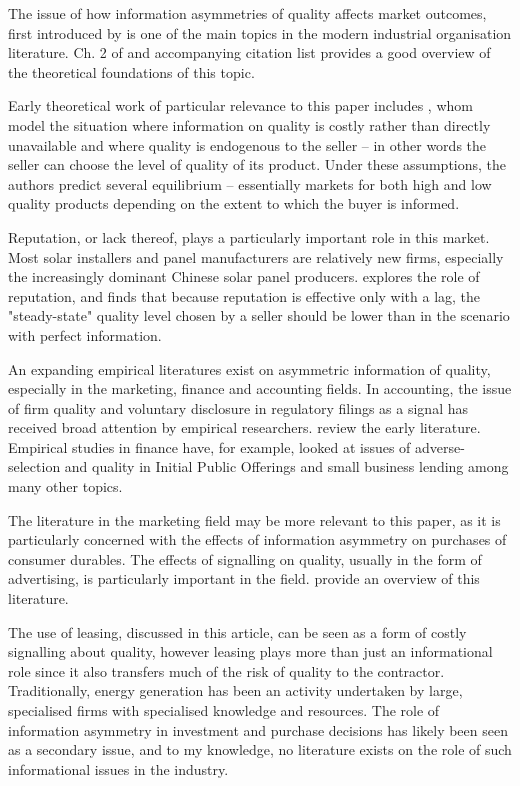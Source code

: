 \documentclass[12pt]{article}
\begin{document}
The issue of how information asymmetries of quality affects market outcomes, first introduced by \citet{akerlof_market_1970} is one of the main topics in the modern industrial organisation literature. Ch. 2 of \citet{tirole_theory_1988} and accompanying citation list provides a good overview of the theoretical foundations of this topic.

Early theoretical work of particular relevance to this paper includes \citet{chan_prices_1982}, whom model the situation where information on quality is costly rather than directly unavailable and where quality is endogenous to the seller -- in other words the seller can choose the level of quality of its product. Under these assumptions, the authors predict several equilibrium -- essentially markets for both high and low quality products depending on the extent to which the buyer is informed.

Reputation, or lack thereof, plays a particularly important role in this market. Most solar installers and panel manufacturers are relatively new firms, especially the increasingly dominant Chinese solar panel producers. \citet{shapiro_consumer_1982} explores the role of reputation, and finds that because reputation is effective only with a lag, the "steady-state" quality level chosen by a seller should be lower than in the scenario with perfect information.

An expanding empirical literatures exist on asymmetric information of quality, especially in the marketing, finance and accounting fields. In accounting, the issue of firm quality and voluntary disclosure in regulatory filings as a signal has received broad attention by empirical researchers. \citet{healy_information_2001} review the early literature. Empirical studies in finance have, for example, looked at issues of adverse-selection and quality in Initial Public Offerings \citep{michaely_pricing_1994} and small business lending \citep{petersen_benefits_1994} among many other topics.

The literature in the marketing field may be more relevant to this paper, as it is particularly concerned with the effects of information asymmetry on purchases of consumer durables. The effects of signalling on quality, usually in the form of advertising, is particularly important in the field. \citet{kirmani_no_2000} provide an overview of this literature.

The use of leasing, discussed in this article, can be seen as a form of costly signalling about quality, however leasing plays more than just an informational role since it also transfers much of the risk of quality to the contractor. Traditionally, energy generation has been an activity undertaken by large, specialised firms with specialised knowledge and resources. The role of information asymmetry in investment and purchase decisions has likely been seen as a secondary issue, and to my knowledge, no literature exists on the role of such informational issues in the industry.
\end{document}
